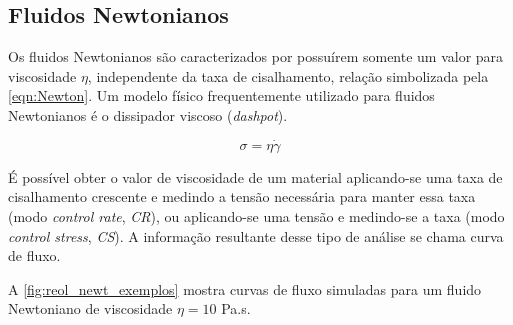 			\subsection{Fluidos Newtonianos}
			
			Os fluidos Newtonianos são caracterizados por possuírem somente um valor para viscosidade \(\eta\), independente da taxa de cisalhamento, relação simbolizada pela \autoref{eqn:Newton}.\cite{Goodwin2008} Um modelo físico frequentemente utilizado para fluidos Newtonianos é o dissipador viscoso (\emph{dashpot}).\cite{Goodwin2008}
			
			\begin{equation}
				\sigma = \eta\dot{\gamma}
				\label{eqn:Newton}
			\end{equation}  
			
			É possível obter o valor de viscosidade de um material aplicando-se uma taxa de cisalhamento crescente e medindo a tensão necessária para manter essa taxa (modo \emph{control rate}, \emph{CR}), ou aplicando-se uma tensão e medindo-se a taxa (modo \emph{control stress}, \emph{CS}). A informação resultante desse tipo de análise se chama curva de fluxo.\cite{Schramm1994} 
			
			A \autoref{fig:reol_newt_exemplos} mostra curvas de fluxo simuladas para um fluido Newtoniano de viscosidade \(\eta=10\) Pa.s\menosUm.
			
